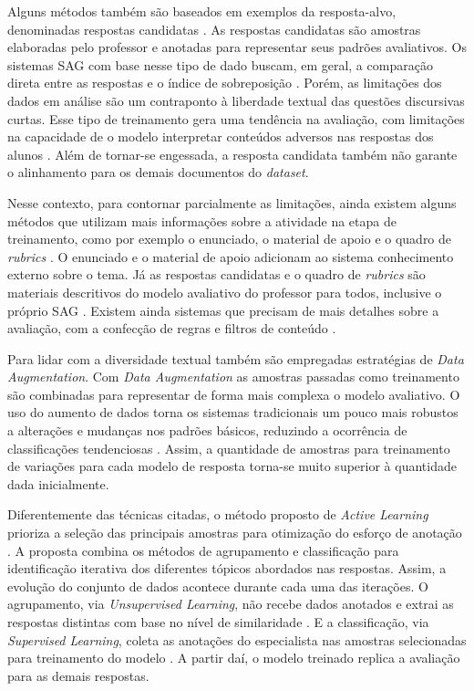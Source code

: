 Alguns métodos também são baseados em exemplos da resposta-alvo, denominadas respostas candidatas \cite{banjade2015, roy2016}. As respostas candidatas são amostras elaboradas pelo professor e anotadas para representar seus padrões avaliativos. Os sistemas SAG com base nesse tipo de dado buscam, em geral, a comparação direta entre as respostas e o índice de sobreposição \cite{jimenez2013, kar2017, zhang2020}. Porém, as limitações dos dados em análise são um contraponto à liberdade textual das questões discursivas curtas. Esse tipo de treinamento gera uma tendência na avaliação, com limitações na capacidade de o modelo interpretar conteúdos adversos nas respostas dos alunos \cite{ramachandran2015a}. Além de tornar-se engessada, a resposta candidata também não garante o alinhamento para os demais documentos do \textit{dataset}.

Nesse contexto, para contornar parcialmente as limitações, ainda existem alguns métodos que utilizam mais informações sobre a atividade na etapa de treinamento, como por exemplo o enunciado, o material de apoio e o quadro de \textit{rubrics} \cite{ramachandran2015b, wang2019}. O enunciado e o material de apoio adicionam ao sistema conhecimento externo sobre o tema. Já as respostas candidatas e o quadro de \textit{rubrics} são materiais descritivos do modelo avaliativo do professor para todos, inclusive o próprio SAG \cite{mizumoto2019, marvaniya2018}. Existem ainda sistemas que precisam de mais detalhes sobre a avaliação, com a confecção de regras e filtros de conteúdo \cite{butcher2010, pribadi2017}.

Para lidar com a diversidade textual também são empregadas estratégias de \textit{Data Augmentation}. Com \textit{Data Augmentation} as amostras passadas como treinamento são combinadas para representar de forma mais complexa o modelo avaliativo. O uso do aumento de dados torna os sistemas tradicionais um pouco mais robustos a alterações e mudanças nos padrões básicos, reduzindo a ocorrência de classificações tendenciosas \cite{kumar2019, lun2020}. Assim, a quantidade de amostras para treinamento de variações para cada modelo de resposta torna-se muito superior à quantidade dada inicialmente.

Diferentemente das técnicas citadas, o método proposto de \textit{Active Learning} prioriza a seleção das principais amostras para otimização do esforço de anotação \cite{kumar2020}. A proposta combina os métodos de agrupamento \cite{spalenza2019} e classificação \cite{oliveira2014} para identificação iterativa dos diferentes tópicos abordados nas respostas. Assim, a evolução do conjunto de dados acontece durante cada uma das iterações. O agrupamento, via \textit{Unsupervised Learning}, não recebe dados anotados e extrai as respostas distintas com base no nível de similaridade \cite{everitt2011}. E a classificação, via \textit{Supervised Learning}, coleta as anotações do especialista nas amostras selecionadas para treinamento do modelo \cite{bishop2006}. A partir daí, o modelo treinado replica a avaliação para as demais respostas.


